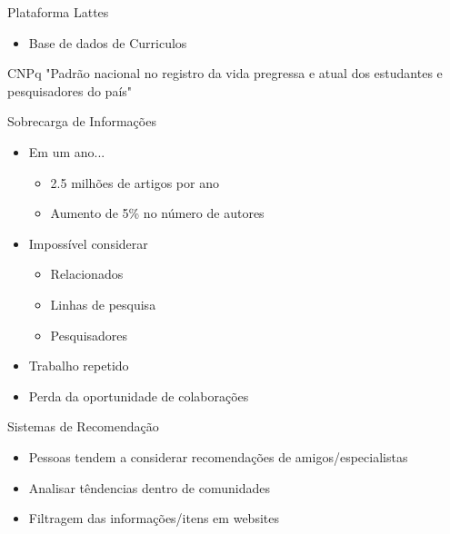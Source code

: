 \documentclass{beamer}
\begin{document}
\begin{frame}{Plataforma Lattes}{}
  
  \begin{itemize}
    \item Base de dados de Curriculos
  \end{itemize}

  \begin{block}{CNPq}
    "Padrão nacional  no  registro  da  vida pregressa e atual dos estudantes e pesquisadores do país"
  \end{block}

\end{frame}

\begin{frame}{Sobrecarga de Informações}{}

  \begin{itemize}
    \item Em um ano... 
    \begin{itemize}
      \item 2.5 milhões de artigos por ano
      \item Aumento de 5\% no número de autores 
    \end{itemize}

    \item Impossível considerar
    \begin{itemize}
      \item Relacionados
      \item Linhas de pesquisa
      \item Pesquisadores 
    \end{itemize}

    \item Trabalho repetido
    \item Perda da oportunidade de colaborações 

  \end{itemize}

\end{frame}

\begin{frame}{Sistemas de Recomendação}{}

  \begin{itemize}
    \item Pessoas tendem a considerar recomendações de amigos/especialistas
    \item Analisar têndencias dentro de comunidades
    \item Filtragem das informações/itens em websites
  \end{itemize}

\end{frame}
\end{document}

